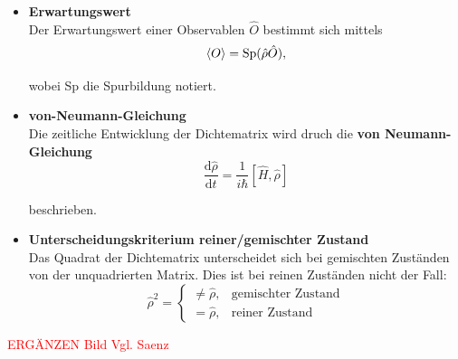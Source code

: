 \documentclass{article}
\newcommand{\diff}{\mathrm{d}}
\begin{document}
	\begin{itemize}
		\item \textbf{Erwartungswert}\\
		Der Erwartungswert einer Observablen $\hat{O}$ bestimmt sich mittels
			\begin{equation}
				\braket{O} = \text{Sp}(\hat{\rho}\hat{O}),
			\end{equation}
		
		wobei Sp die Spurbildung notiert.\\
	
	
		\item \textbf{von-Neumann-Gleichung}\\
		Die zeitliche Entwicklung der Dichtematrix wird druch die \textbf{von Neumann-Gleichung}
			\begin{equation}
				\frac{\diff\hat{\rho}}{\diff t} = \frac{1}{i\hbar} [\hat{H}, \hat{\rho}]
			\end{equation}
		
		beschrieben.
		

		\item \textbf{Unterscheidungskriterium reiner/gemischter Zustand}\\
		Das Quadrat der Dichtematrix unterscheidet sich bei gemischten Zuständen von der unquadrierten Matrix. Dies ist bei reinen Zuständen nicht der Fall:
			\begin{equation}
				\hat{\rho}^2 =
				\begin{cases}
					\neq \hat{\rho}, & \text{gemischter Zustand} \\
					= \hat{\rho}, & \text{reiner Zustand}
				\end{cases}
			\end{equation}
	\end{itemize}


\textcolor{red}{ERGÄNZEN Bild Vgl. Saenz}


%		
%		
%		
%		
\end{document}
